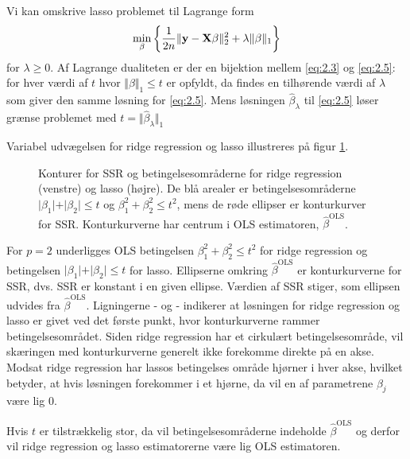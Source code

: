 Vi kan omskrive lasso problemet til Lagrange form
\begin{align}
\min_{\beta} \cbr{\frac{1}{2n} \Vert \y - \X \beta \Vert_2^2 + \lambda \Vert \beta \Vert_1} \label{eq:2.5}
\end{align}
for $\lambda \geq 0$.
Af Lagrange dualiteten er der en bijektion mellem \eqref{eq:2.3} og \eqref{eq:2.5}: for hver værdi af \(t\) hvor \(\Vert \beta \Vert_1 \leq t\) er opfyldt, da findes en tilhørende værdi af $\lambda$ som giver den samme løsning for \eqref{eq:2.5}.
Mens løsningen $\hat{\beta}_\lambda$ til \eqref{eq:2.5} løser grænse problemet med $t=\Vert \hat{\beta}_\lambda \Vert_1$

Variabel udvægelsen for ridge regression og lasso illustreres på figur \ref{fig:LassoRig}.
\begin{figure}[H]
\begin{minipage}{0.5\linewidth}
\scalebox{0.8}{}
\end{minipage}
\hspace{0.3cm}
\begin{minipage}{0.5\linewidth}
\scalebox{0.8}{}
\end{minipage}
\caption{Konturer for SSR og betingelsesområderne for ridge regression (venstre) og lasso (højre). De blå arealer er betingelsesområderne $\vert \beta_1 \vert+\vert \beta_2 \vert \leq t$ og $\beta_1^2+\beta_2^2 \leq t^2$, mens de røde ellipser er konturkurver for SSR. Konturkurverne har centrum i OLS estimatoren, $\hat{\beta}^\text{OLS}$.} \label{fig:LassoRig}
\end{figure}
For $p=2$ underligges OLS betingelsen $\beta_1^2 + \beta_2^2 \leq t^2$ for ridge regression og betingelsen $\vert \beta_1 \vert + \vert \beta_2 \vert \leq t$ for lasso.
Ellipserne omkring $\hat{\beta}^{\text{OLS}}$ er konturkurverne for SSR, dvs. SSR er konstant i en given ellipse. Værdien af SSR stiger, som ellipsen udvides fra $\hat{\beta}^{\text{OLS}}$.
Ligningerne - og - indikerer at løsningen for ridge regression og lasso er givet ved det første punkt, hvor konturkurverne rammer betingelsesområdet.
Siden ridge regression har et cirkulært betingelsesområde, vil skæringen med konturkurverne generelt ikke forekomme direkte på en akse.
Modsat ridge regression har lassos betingelses område hjørner i hver akse, hvilket betyder, at hvis løsningen forekommer i et hjørne, da vil en af parametrene $\beta_j$ være lig 0.

Hvis $t$ er tilstrækkelig stor, da vil betingelsesområderne indeholde $\hat{\beta}^{\text{OLS}}$ og derfor vil ridge regression og lasso estimatorerne være lig OLS estimatoren.

